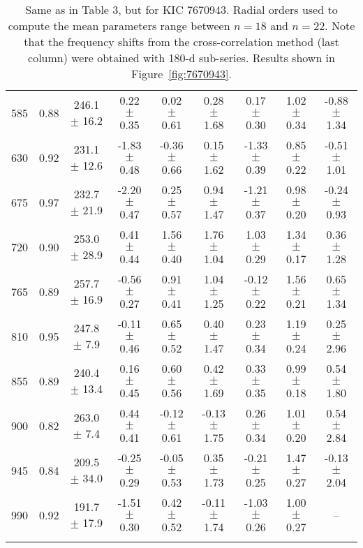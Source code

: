 \documentclass[twocolumn]{aastex61}%
\begin{document}
\begin{table*}[ht]
\begin{tabular}{ccc|ccccc|c}
585 & 0.88 & 246.1 $\pm$ 16.2 & 0.22 $\pm$ 0.35 & 0.02 $\pm$ 0.61 & 0.28 $\pm$ 1.68 & 0.17 $\pm$ 0.30 & 1.02 $\pm$ 0.34 & -0.88 $\pm$ 1.34\\
630 & 0.92 & 231.1 $\pm$ 12.6 & -1.83 $\pm$ 0.48 & -0.36 $\pm$ 0.66 & 0.15 $\pm$ 1.62 & -1.33 $\pm$ 0.39 & 0.85 $\pm$ 0.22 & -0.51 $\pm$ 1.01\\
675 & 0.97 & 232.7 $\pm$ 21.9 & -2.20 $\pm$ 0.47 & 0.25 $\pm$ 0.57 & 0.94 $\pm$ 1.47 & -1.21 $\pm$ 0.37 & 0.98 $\pm$ 0.20 & -0.24 $\pm$ 0.93\\
720 & 0.90 & 253.0 $\pm$ 28.9 & 0.41 $\pm$ 0.44 & 1.56 $\pm$ 0.40 & 1.76 $\pm$ 1.04 & 1.03 $\pm$ 0.29 & 1.34 $\pm$ 0.17 & 0.36 $\pm$ 1.28\\
765 & 0.89 & 257.7 $\pm$ 16.9 & -0.56 $\pm$ 0.27 & 0.91 $\pm$ 0.41 & 1.04 $\pm$ 1.25 & -0.12 $\pm$ 0.22 & 1.56 $\pm$ 0.21 & 0.65 $\pm$ 1.34\\
810 & 0.95 & 247.8 $\pm$ 7.9 & -0.11 $\pm$ 0.46 & 0.65 $\pm$ 0.52 & 0.40 $\pm$ 1.47 & 0.23 $\pm$ 0.34 & 1.19 $\pm$ 0.24 & 0.25 $\pm$ 2.96\\
855 & 0.89 & 240.4 $\pm$ 13.4 & 0.16 $\pm$ 0.45 & 0.60 $\pm$ 0.56 & 0.42 $\pm$ 1.69 & 0.33 $\pm$ 0.35 & 0.99 $\pm$ 0.18 & 0.54 $\pm$ 1.80\\
900 & 0.82 & 263.0 $\pm$ 7.4 & 0.44 $\pm$ 0.41 & -0.12 $\pm$ 0.61 & -0.13 $\pm$ 1.75 & 0.26 $\pm$ 0.34 & 1.01 $\pm$ 0.20 & 0.54 $\pm$ 2.84\\
945 & 0.84 & 209.5 $\pm$ 34.0 & -0.25 $\pm$ 0.29 & -0.05 $\pm$ 0.53 & 0.35 $\pm$ 1.73 & -0.21 $\pm$ 0.25 & 1.47 $\pm$ 0.27 & -0.13 $\pm$ 2.04\\
990 & 0.92 & 191.7 $\pm$ 17.9 & -1.51 $\pm$ 0.30 & 0.42 $\pm$ 0.52 & -0.11 $\pm$ 1.74 & -1.03 $\pm$ 0.26 & 1.00 $\pm$ 0.27 & --\\\vspace{-0.3cm}
\end{tabular}
\caption{Same as in Table 3, but for KIC 7670943. {Radial orders used to compute the mean parameters range between $n=18$ and $n=22$.} Note that the frequency shifts from the cross-correlation method (last column) were obtained with 180-d sub-series. Results shown in Figure~\ref{fig:7670943}.}\label{tab:7670943}
\end{table*}
\end{document}
